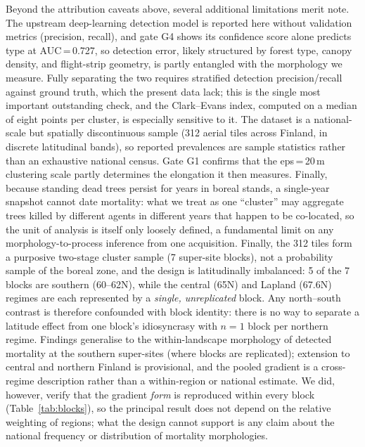 \documentclass[twocolumn]{article}
\begin{document}
Beyond the attribution caveats above, several additional limitations merit note. The upstream
deep-learning detection model is reported here without validation metrics (precision, recall), and
gate G4 shows its confidence score alone predicts type at AUC\,=\,0.727, so detection error,
likely structured by forest type, canopy density, and flight-strip geometry, is partly entangled
with the morphology we measure. Fully separating the two requires stratified detection
precision/recall against ground truth, which the present data lack; this is the single most
important outstanding check, and the Clark--Evans index, computed on a median of eight points per
cluster, is especially sensitive to it. The dataset is a national-scale but spatially
discontinuous sample (312 aerial tiles across Finland, in discrete latitudinal bands), so reported
prevalences are sample statistics rather than an exhaustive national census. Gate G1 confirms that the
eps\,=\,20\,m clustering scale partly determines the elongation it then measures. Finally,
because standing dead trees persist for years in boreal stands, a single-year snapshot cannot
date mortality: what we treat as one ``cluster'' may aggregate trees killed by different agents in
different years that happen to be co-located, so the unit of analysis is itself only loosely
defined, a fundamental limit on any morphology-to-process inference from one acquisition. Finally,
the 312 tiles form a purposive two-stage cluster sample (7 super-site blocks), not a probability
sample of the boreal zone, and the design is latitudinally imbalanced: 5 of the 7 blocks are
southern (60--62\textdegree{}N), while the central (65\textdegree{}N) and Lapland
(67.6\textdegree{}N) regimes are each represented by a \emph{single, unreplicated} block. Any
north--south contrast is therefore confounded with block identity: there is no way to separate a
latitude effect from one block's idiosyncrasy with $n=1$ block per northern regime. Findings
generalise to the within-landscape morphology of detected mortality at the southern super-sites
(where blocks are replicated); extension to central and northern Finland is provisional, and the
pooled gradient is a cross-regime description rather than a within-region or national estimate.
We did, however, verify that the gradient \emph{form} is reproduced within every block
(Table~\ref{tab:blocks}), so the principal result does not depend on the relative weighting of
regions; what the design cannot support is any claim about the national frequency or distribution
of mortality morphologies.
\end{document}

